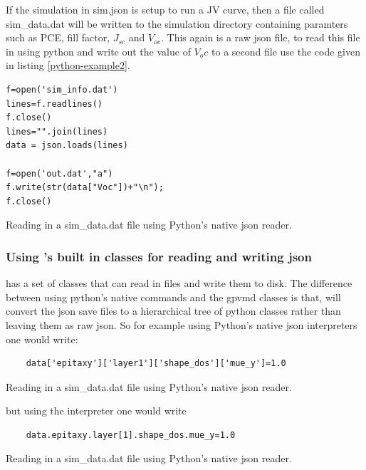 If the simulation in sim.json is setup to run a JV curve, then a file called sim\_data.dat will be written to the simulation directory containing paramters such as PCE, fill factor, $J_{sc}$ and $V_{oc}$.  This again is a raw json file, to read this file in using python and write out the value of $V_oc$ to a second file use the code given in listing \ref{python-example2}.

\begin{listing}
\begin{verbatim}
f=open('sim_info.dat')
lines=f.readlines()
f.close()
lines="".join(lines)
data = json.loads(lines)

f=open('out.dat',"a")
f.write(str(data["Voc"])+"\n");
f.close()

\end{verbatim}
\caption{Reading in a sim\_data.dat file using Python's native json reader.} 
\label{python-example2}
\end{listing}



\subsubsection{Using \simname's built in classes for reading and writing json}
\simname has a set of classes that can read in \simname files and write them to disk. The difference between using python's native commands and the gpvmd classes is that, \simname will convert the json save files to a hierarchical tree of python classes rather than leaving them as raw json. So for example using Python's native json interpreters one would write:

 
\begin{listing}
\begin{verbatim}
	data['epitaxy']['layer1']['shape_dos']['mue_y']=1.0
\end{verbatim}
\caption{Reading in a sim\_data.dat file using Python's native json reader.} 
\label{python-example3}
\end{listing}

but using the \simname interpreter one would write

\begin{listing}
\begin{verbatim}
	data.epitaxy.layer[1].shape_dos.mue_y=1.0
\end{verbatim}
\caption{Reading in a sim\_data.dat file using Python's native json reader.} 
\label{python-example4}
\end{listing}

